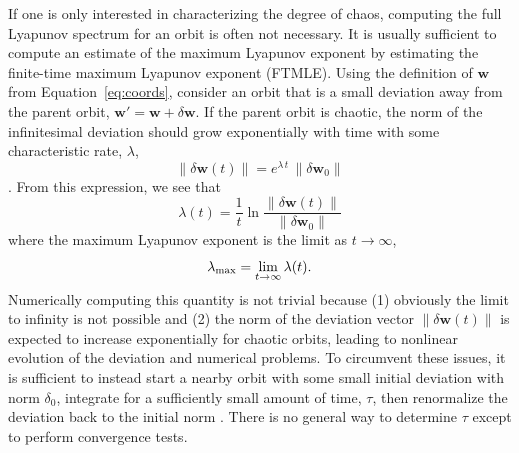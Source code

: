 \documentclass[letterpaper,12pt,preprint]{aastex}
\newcommand{\bs}[1]{\boldsymbol{#1}}
\begin{document}
If one is only interested in characterizing the degree of chaos, computing the full Lyapunov spectrum for an orbit is often not necessary. It is usually sufficient to compute an estimate of the maximum Lyapunov exponent by estimating the finite-time maximum Lyapunov exponent (FTMLE). Using the definition of $\boldsymbol{w}$ from Equation~\ref{eq:coords}, consider an orbit that is a small deviation away from the parent orbit, $\boldsymbol{w}' = \boldsymbol{w} + \delta\boldsymbol{w}$. If the parent orbit is chaotic, the norm of the infinitesimal deviation should grow exponentially with time with some characteristic rate, $\lambda$,
\begin{equation}
	\|\delta\boldsymbol{w}(t)\| = e^{\lambda \, t} \, \|\delta\boldsymbol{w}_0\|
\end{equation}
\citep[see, e.g.,][]{lichtenberg83,tabor89}. From this expression, we see that
\begin{equation}
	\lambda(t) = \frac{1}{t}\ln \frac{\|\delta \bs{w}(t)\|}{\|\delta \bs{w}_0\|} \label{eq:mle}
\end{equation}
where the maximum Lyapunov exponent is the limit as $t\rightarrow \infty$,
\begin{equation}
	\lambda_{\rm max} = \lim_{t\rightarrow\infty}\lambda(t). \label{eq:lmax}
\end{equation}
Numerically computing this quantity is not trivial because (1) obviously the limit to infinity is not possible and (2) the norm of the deviation vector $\|\delta \bs{w}(t)\|$ is expected to increase exponentially for chaotic orbits, leading to nonlinear evolution of the deviation and numerical problems. To circumvent these issues, it is sufficient to instead start a nearby orbit with some small initial deviation with norm $\delta_0$, integrate for a sufficiently small amount of time, $\tau$, then renormalize the deviation back to the initial norm \citep{benettin76}. There is no general way to determine $\tau$ except to perform convergence tests.
\end{document}
